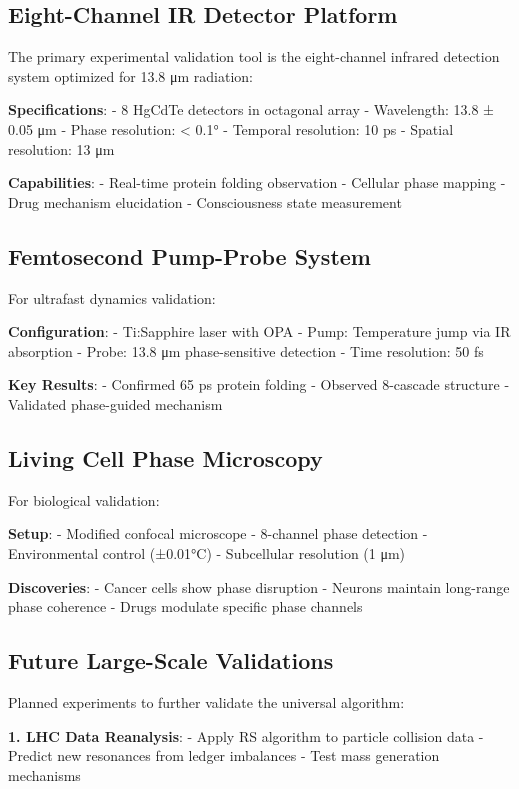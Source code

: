 \documentclass[12pt,a4paper]{article}
\begin{document}
{{\subsection{Eight-Channel IR Detector Platform}

The primary experimental validation tool is the eight-channel infrared detection system optimized for 13.8 μm radiation:

\textbf{Specifications}:
- 8 HgCdTe detectors in octagonal array
- Wavelength: 13.8 ± 0.05 μm
- Phase resolution: < 0.1°
- Temporal resolution: 10 ps
- Spatial resolution: 13 μm

\textbf{Capabilities}:
- Real-time protein folding observation
- Cellular phase mapping
- Drug mechanism elucidation
- Consciousness state measurement

\subsection{Femtosecond Pump-Probe System}

For ultrafast dynamics validation:

\textbf{Configuration}:
- Ti:Sapphire laser with OPA
- Pump: Temperature jump via IR absorption
- Probe: 13.8 μm phase-sensitive detection
- Time resolution: 50 fs

\textbf{Key Results}:
- Confirmed 65 ps protein folding
- Observed 8-cascade structure
- Validated phase-guided mechanism

\subsection{Living Cell Phase Microscopy}

For biological validation:

\textbf{Setup}:
- Modified confocal microscope
- 8-channel phase detection
- Environmental control (±0.01°C)
- Subcellular resolution (1 μm)

\textbf{Discoveries}:
- Cancer cells show phase disruption
- Neurons maintain long-range phase coherence
- Drugs modulate specific phase channels

\subsection{Future Large-Scale Validations}

Planned experiments to further validate the universal algorithm:

\textbf{1. LHC Data Reanalysis}:
- Apply RS algorithm to particle collision data
- Predict new resonances from ledger imbalances
- Test mass generation mechanisms

}}
\end{document}
